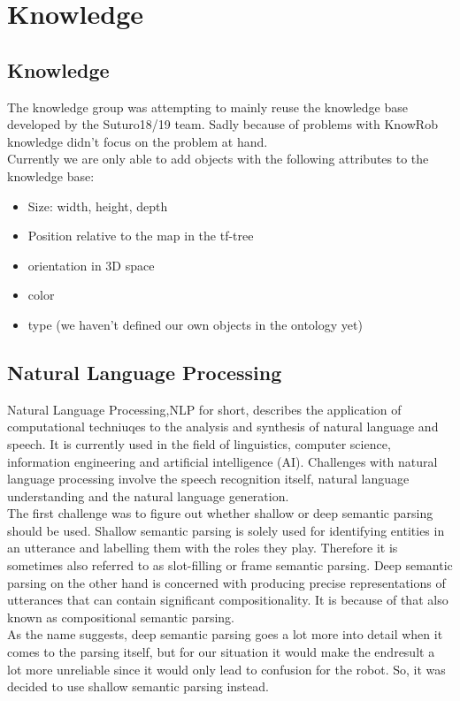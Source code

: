 \documentclass[main.tex]{subfiles}
\begin{document}
	
	\chapter{Knowledge}
		\section{Knowledge}
		The knowledge group was attempting to mainly reuse the knowledge base developed by the Suturo18/19 team. Sadly because of problems with KnowRob knowledge didn't focus on the problem at hand.\\
		Currently we are only able to add objects with the following attributes to the knowledge base:\\
		\begin{itemize}
			\item Size: width, height, depth
			\item Position relative to the map in the tf-tree
			\item orientation in 3D space
			\item color
			\item type (we haven't defined our own objects in the ontology yet)
		\end{itemize}
		
		
	
		\section{Natural Language Processing}
		Natural Language Processing,NLP for short, describes the application of computational techniuqes to the analysis and synthesis of natural language and speech. It is currently used in the field of linguistics, computer science, information engineering and artificial intelligence (AI). Challenges with natural language processing involve the speech recognition itself, natural language understanding and the natural language generation.\\
		The first challenge was to figure out whether shallow or deep semantic parsing should be used. Shallow semantic parsing is solely used for identifying entities in an utterance and labelling them with the roles they play. Therefore it is sometimes also referred to as slot-filling or frame semantic parsing. Deep semantic parsing on the other hand is concerned with producing precise representations of utterances that can contain significant compositionality. It is because of that also known as compositional semantic parsing.\\
		As the name suggests, deep semantic parsing goes a lot more into detail when it comes to the parsing itself, but for our situation it would make the endresult a lot more unreliable since it would only lead to confusion for the robot. So, it was decided to use shallow semantic parsing instead.
		
\end{document}
